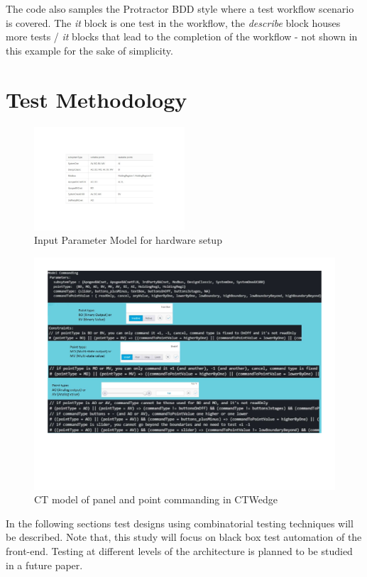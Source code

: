 \documentclass[conference]{IEEEtran}
\begin{document}
	The code also samples the Protractor BDD style where a test workflow scenario is covered. 
	The \textit{it} block is one test in the workflow, the \textit{describe} block houses more tests / \textit{it} blocks that lead to the completion of the workflow - not shown in this example for the sake of simplicity.

\section{Test Methodology}
\begin{figure}[!bh]
	\includegraphics[width=0.50\textwidth,]{commandingIPM.pdf}
	\caption{Input Parameter Model for hardware setup}
	\label{fig:commandingIPM}
\end{figure}

\begin{figure}[!t]
	\centering
		\includegraphics[width=1.00\textwidth,]{modelCommanding.pdf}
		\caption{CT model of panel and point commanding in CTWedge}
		\label{fig:modelCommanding}
\end{figure}
	
	In the following sections test designs using combinatorial testing techniques will be described. 
	Note that, this study will focus on black box test automation of the front-end. Testing at different levels of the architecture is planned to be studied in a future paper.
\end{document}
